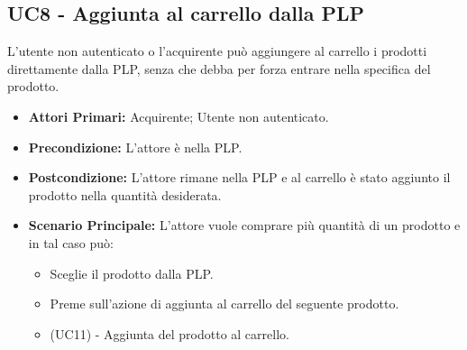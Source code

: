 \subsection{UC8 - Aggiunta al carrello dalla PLP} \label{UC8}
L'utente non autenticato o l'acquirente può aggiungere al carrello i prodotti direttamente dalla PLP, senza che debba per forza entrare nella  specifica del prodotto.
\begin{itemize}
    \item \textbf{Attori Primari:} Acquirente; Utente non autenticato.
    \item \textbf{Precondizione:} L'attore è nella PLP.
    \item \textbf{Postcondizione:} L'attore rimane nella PLP e al carrello è stato aggiunto il prodotto nella quantità desiderata.
    \item \textbf{Scenario Principale:} L'attore vuole comprare più quantità di un prodotto e in tal caso può:
    \begin{itemize}
        \item Sceglie il prodotto dalla PLP.
        \item Preme sull'azione di aggiunta al carrello del seguente prodotto.
        \item (UC11) - Aggiunta del prodotto al carrello.
    \end{itemize}
\end{itemize}
